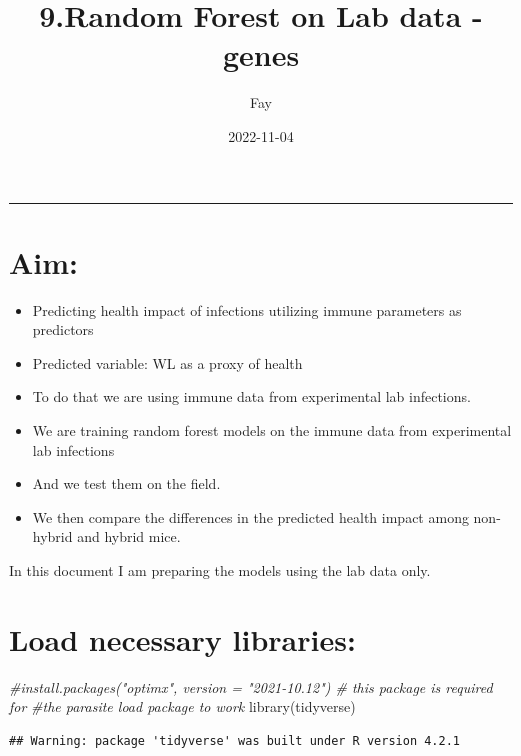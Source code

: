 \documentclass[
]{article}
\title{9.Random Forest on Lab data -genes}
\author{Fay}
\date{2022-11-04}
\newenvironment{Shaded}{\begin{snugshade}}{\end{snugshade}}
\newcommand{\CommentTok}[1]{\textcolor[rgb]{0.56,0.35,0.01}{\textit{#1}}}
\newcommand{\FunctionTok}[1]{\textcolor[rgb]{0.00,0.00,0.00}{#1}}
\newcommand{\NormalTok}[1]{#1}
\providecommand{\tightlist}{%
  \setlength{\itemsep}{0pt}\setlength{\parskip}{0pt}}
\begin{document}
\maketitle

\begin{center}\rule{0.5\linewidth}{0.5pt}\end{center}

\hypertarget{aim}{%
\section{Aim:}\label{aim}}

\begin{itemize}
\tightlist
\item
  Predicting health impact of infections utilizing immune parameters as
  predictors
\item
  Predicted variable: WL as a proxy of health
\item
  To do that we are using immune data from experimental lab infections.
\item
  We are training random forest models on the immune data from
  experimental lab infections
\item
  And we test them on the field.
\item
  We then compare the differences in the predicted health impact among
  non-hybrid and hybrid mice.
\end{itemize}

In this document I am preparing the models using the lab data only.

\hypertarget{load-necessary-libraries}{%
\section{Load necessary libraries:}\label{load-necessary-libraries}}

\begin{Shaded}
\begin{Highlighting}[]
\CommentTok{\#install.packages("optimx", version = "2021{-}10.12") \# this package is required for }
\CommentTok{\#the parasite load package to work}
\FunctionTok{library}\NormalTok{(tidyverse)}
\end{Highlighting}
\end{Shaded}

\begin{verbatim}
## Warning: package 'tidyverse' was built under R version 4.2.1
\end{verbatim}
\end{document}
